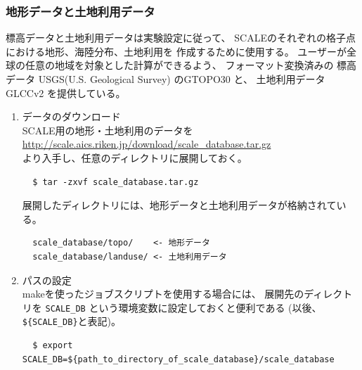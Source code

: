 \subsubsection{地形データと土地利用データ}
標高データと土地利用データは実験設定に従って、
SCALEのそれぞれの格子点における地形、海陸分布、土地利用を
作成するために使用する。
ユーザーが全球の任意の地域を対象とした計算ができるよう、
フォーマット変換済みの
標高データ USGS(U.S. Geological Survey) のGTOPO30 と、
土地利用データ GLCCv2 を提供している。

\begin{enumerate}
\item データのダウンロード\\
SCALE用の地形・土地利用のデータを\\
 \url{http://scale.aics.riken.jp/download/scale_database.tar.gz}\\
より入手し、任意のディレクトリに展開しておく。
\begin{verbatim}
  $ tar -zxvf scale_database.tar.gz
\end{verbatim}
展開したディレクトリには、地形データと土地利用データが格納されている。
\begin{verbatim}
  scale_database/topo/    <- 地形データ
  scale_database/landuse/ <- 土地利用データ
\end{verbatim}

\item パスの設定\\
makeを使ったジョブスクリプトを使用する場合には、
展開先のディレクトリを \verb|SCALE_DB| という環境変数に設定しておくと便利である
(以後、\verb|${SCALE_DB}|と表記)。
\begin{verbatim}
  $ export SCALE_DB=${path_to_directory_of_scale_database}/scale_database
\end{verbatim}
\end{enumerate}

